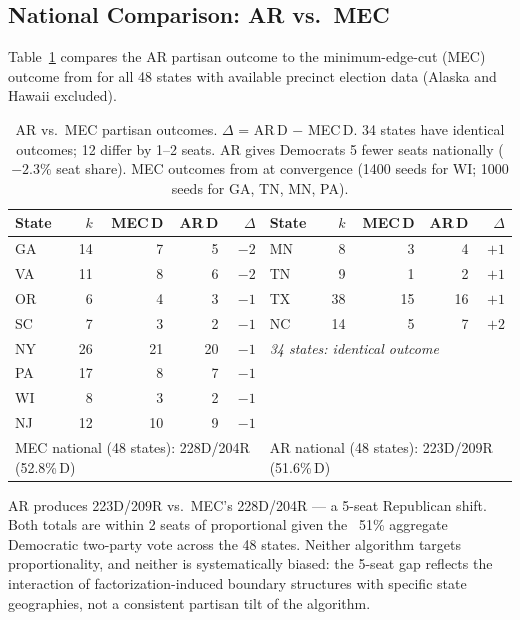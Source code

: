 \subsection{National Comparison: AR vs.\ MEC}
\label{sec:eval:national}

Table~\ref{tab:national-pfr-mec} compares the AR partisan outcome to the
minimum-edge-cut (MEC) outcome from \citet{dellaLibera2026mec} for all 48
states with available precinct election data (Alaska and Hawaii excluded).

\begin{table}[h]
\centering\small
\begin{tabular}{lrrrr|lrrrr}
\toprule
State & $k$ & MEC\,D & AR\,D & $\Delta$ &
State & $k$ & MEC\,D & AR\,D & $\Delta$ \\
\midrule
GA & 14 & 7 & 5 & $-2$ & MN & 8  & 3  & 4  & $+1$ \\
VA & 11 & 8 & 6 & $-2$ & TN & 9  & 1  & 2  & $+1$ \\
OR &  6 & 4 & 3 & $-1$ & TX & 38 & 15 & 16 & $+1$ \\
SC &  7 & 3 & 2 & $-1$ & NC & 14 & 5  & 7  & $+2$ \\
NY & 26 & 21& 20& $-1$ & \multicolumn{5}{l}{\emph{34 states: identical outcome}} \\
PA & 17 & 8 & 7 & $-1$ & & & & & \\
WI &  8 & 3 & 2 & $-1$ & & & & & \\
NJ & 12 & 10& 9 & $-1$ & & & & & \\
\midrule
\multicolumn{5}{l|}{MEC national (48 states): 228D/204R (52.8\%\,D)} &
\multicolumn{5}{l}{AR national (48 states): 223D/209R (51.6\%\,D)} \\
\bottomrule
\end{tabular}
\caption{AR vs.\ MEC partisan outcomes. $\Delta$ = AR\,D $-$ MEC\,D.
  34 states have identical outcomes; 12 differ by 1--2 seats. AR gives
  Democrats 5 fewer seats nationally ($-2.3\%$ seat share).
  MEC outcomes from \citet{dellaLibera2026mec} at convergence
  (1400 seeds for WI; 1000 seeds for GA, TN, MN, PA).}
\label{tab:national-pfr-mec}
\end{table}

AR produces 223D/209R vs.\ MEC's 228D/204R --- a 5-seat Republican shift.
Both totals are within 2 seats of proportional given the ~51\% aggregate
Democratic two-party vote across the 48 states. Neither algorithm targets
proportionality, and neither is systematically biased: the 5-seat gap reflects
the interaction of factorization-induced boundary structures with specific
state geographies, not a consistent partisan tilt of the algorithm.

